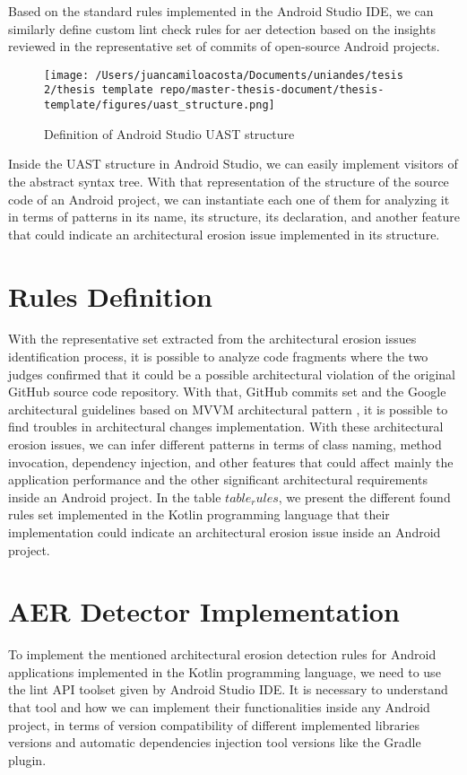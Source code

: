 Based on the standard rules implemented in the Android Studio IDE, we can similarly define custom lint check rules for aer detection based on the insights reviewed in the representative set of commits of open-source Android projects. 

\begin{figure}[h]
    	\centering
    		\texttt{[image: /Users/juancamiloacosta/Documents/uniandes/tesis 2/thesis template repo/master-thesis-document/thesis-template/figures/uast\_structure.png]}
   			 \caption{Definition of Android Studio UAST structure \citet{} }
   			 \label{fig:ast}
\end{figure}

Inside the UAST structure in Android Studio, we can easily implement visitors of the abstract syntax tree. With that representation of the structure of the source code of an Android project, we can instantiate each one of them for analyzing it in terms of patterns in its name, its structure, its declaration, and another feature that could indicate an architectural erosion issue implemented in its structure.

\section{Rules Definition}
With the representative set extracted from the architectural erosion issues identification process, it is possible to analyze code fragments where the two judges confirmed that it could be a possible architectural violation of the original GitHub source code repository. With that, GitHub commits set and the Google architectural guidelines based on MVVM architectural pattern \citet{}, it is possible to find troubles in architectural changes implementation. With these architectural erosion issues, we can infer different patterns in terms of class naming, method invocation, dependency injection, and other features that could affect mainly the application performance and the other significant architectural requirements inside an Android project. In the table $table_rules$, we present the different found rules set implemented in the Kotlin programming language that their implementation could indicate an architectural erosion issue inside an Android project.

\section{AER Detector Implementation}
To implement the mentioned architectural erosion detection rules for Android applications implemented in the Kotlin programming language, we need to use the lint API toolset given by Android Studio IDE. It is necessary to understand that tool and how we can implement their functionalities inside any Android project, in terms of version compatibility of different implemented libraries versions and automatic dependencies injection tool versions like the Gradle plugin. 

